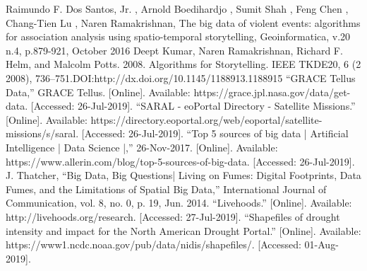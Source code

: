\documentclass[conference]{IEEEtran}
\begin{document}
\begin{thebibliography}{12}
\bibitem {} Raimundo F. Dos Santos, Jr. , Arnold Boedihardjo , Sumit Shah , Feng Chen , Chang-Tien Lu , Naren Ramakrishnan, The big data of violent events: algorithms for association analysis using spatio-temporal storytelling, Geoinformatica, v.20 n.4, p.879-921, October 2016
\bibitem {} Deept Kumar, Naren Ramakrishnan, Richard F. Helm, and Malcolm Potts. 2008. Algorithms for Storytelling. IEEE TKDE20, 6 (2 2008), 736–751.DOI:http://dx.doi.org/10.1145/1188913.1188915
\bibitem {} “GRACE Tellus Data,” GRACE Tellus. [Online]. Available: https://grace.jpl.nasa.gov/data/get-data. [Accessed: 26-Jul-2019].
\bibitem {} “SARAL - eoPortal Directory - Satellite Missions.” [Online]. Available: https://directory.eoportal.org/web/eoportal/satellite-missions/s/saral. [Accessed: 26-Jul-2019].
\bibitem {} “Top 5 sources of big data | Artificial Intelligence | Data Science |,” 26-Nov-2017. [Online]. Available: https://www.allerin.com/blog/top-5-sources-of-big-data. [Accessed: 26-Jul-2019].
\bibitem {} J. Thatcher, “Big Data, Big Questions| Living on Fumes: Digital Footprints, Data Fumes, and the Limitations of Spatial Big Data,” International Journal of Communication, vol. 8, no. 0, p. 19, Jun. 2014.
\bibitem {} “Livehoods.” [Online]. Available: http://livehoods.org/research. [Accessed: 27-Jul-2019].
\bibitem {} “Shapefiles of drought intensity and impact for the North American Drought Portal.” [Online]. Available: https://www1.ncdc.noaa.gov/pub/data/nidis/shapefiles/. [Accessed: 01-Aug-2019].


\end{thebibliography}
\end{document}
